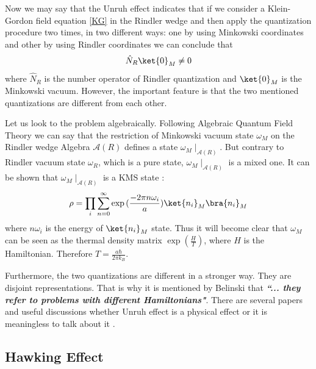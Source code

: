 \documentclass[12pt]{article}
\begin{document}
Now we may say that the Unruh effect indicates that if we consider a Klein-Gordon field equation \ref{KG}
 in the Rindler wedge and then apply the quantization procedure two times, in two different ways: one by using Minkowski coordinates and other by using Rindler coordinates we can conclude that 
\begin{equation}
\hat{N}_R\ket{0}_M\neq 0
\end{equation}
 where $\hat{N}_R$ is the number operator of Rindler quantization and $\ket{0}_M$ is the Minkowski vacuum. However, the important feature is that the two mentioned quantizations are different from each other. 

Let us look to the problem algebraically. Following Algebraic Quantum Field Theory we can say that the restriction of Minkowski vacuum state $\omega_M$ on the Rindler wedge Algebra $\mathcal{A}(R)$ defines a state $\omega_{M}\mid _{\mathcal{A}(R)}$. But contrary to Rindler vacuum state $\omega_R$, which is a pure state, $\omega_{M}\mid _{\mathcal{A}(R)}$ is a mixed one.
 It can be shown that  $\omega_{M}\mid _{\mathcal{A}(R)}$ is a KMS state \cite{Wald}:
\begin{equation}
      \rho=\prod_i \sum_{n=0}^{\infty} \exp{(\frac{-2\pi n \omega_i}{a})}\ket{n_i}_M\bra{n_i}_M
\end{equation} 
where $n\omega_i$ is the energy of $\ket{n_i}_M$ state. Thus it will become clear that $\omega_M$ can be seen as the thermal density matrix $\exp (\frac{H}{T})$, where $H$ is the Hamiltonian. Therefore  $T=\frac{a \hbar}{2\pi k_B }$.

Furthermore, the two quantizations are different in a stronger way. They are disjoint representations. That is why it is mentioned by Belinski \cite{Belinski} that \emph{\textbf{``... they refer to problems with different Hamiltonians"}}. There are several papers and useful discussions whether Unruh effect is a physical effect or it is meaningless to talk about it  \cite{Arageorgis} \cite{Belinski} \cite{Halvorson}.

\subsection{Hawking Effect}\label{section.hawking Effect}
\end{document}
